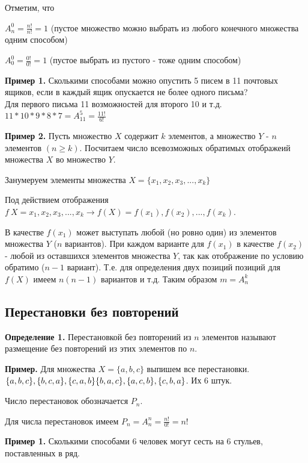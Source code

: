 \documentclass{article}
\begin{document}
    Отметим, что

    \(A_n^0 = \frac{n!}{n!} = 1\) (пустое множество можно выбрать из любого конечного множества одним способом)

    \(A_0^0 = \frac{0!}{0!} = 1\) (пустое выбрать из пустого - тоже одним способом)

    \textbf{Пример 1.} Сколькими способами можно опустить 5 писем в 11 почтовых ящиков, если в каждый ящик опускается не более одного письма?
    \\Для первого письма 11 возможностей для второго 10 и т.д. \(11*10*9*8*7=A_{11}^5=\frac{11!}{6!}\)

    \textbf{Пример 2.} Пусть множество \(X\) содержит \(k\) элементов, а множество \(Y\) - \(n\) элементов \((n \ge k)\). 
    Посчитаем число всевозможных обратимых отображеий множества \(X\) во множество \(Y\).

    Занумеруем элементы множества \(X = \{x_1, x_2, x_3, ..., x_k\}\)

    Под действием отображения \(f\ X = {x_1, x_2, x_3, ..., x_k} \rightarrow f(X) = {f(x_1), f(x_2), ..., f(x_k)}\).

    В качестве \(f(x_1)\) может выступать любой (но ровно один) из элементов множества \(Y\) (\(n\) вариантов). 
    При каждом варианте для \(f(x_1)\) в качестве \(f(x_2)\) - любой из оставшихся элементов множества \(Y\), так как отображение по условию обратимо (\(n-1\) вариант). 
    Т.е. для определения двух позиций позиций для \(f(X)\) имеем \(n(n-1)\) вариантов и т.д.
    Таким образом \(m = A_n^k\)

    \subsection{Перестановки без повторений}
    \textbf{Определение 1.} Перестановкой без повторений из \(n\) элементов называют размещение без повторений из этих элементов по \(n\).

    \textbf{Пример.} Для множества \(X = \{a, b, c\}\) выпишем все перестановки.
    \\\(\{a, b, c\}, \{b, c, a\}, \{c, a, b\}
    \\\{b, a, c\}, \{a, c, b\}, \{c, b, a\}\). Их 6 штук.

    Число перестановок обозначается \(P_n\).

    Для числа перестановок имеем \(P_n = A_n^n = \frac{n!}{0!} = n!\)

    \textbf{Пример 1.} Сколькими способами 6 человек могут сесть на 6 стульев, поставленных в ряд.
\end{document}
